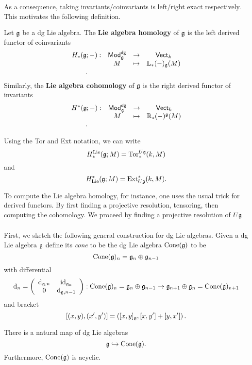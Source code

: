 \documentclass[11pt]{amsart}
\def\dgMod{{\sf Mod}^{\sf dg}}
\begin{document}
As a consequence, taking invariants/coinvariants is left/right exact respectively. 
This motivates the following definition. 

\begin{dfn}
Let $\mathfrak g$ be a dg Lie algebra.
The {\bf Lie algebra homology} of $\mathfrak g$ is the left derived functor of coinvariants
\[
\begin{array}{cccc}
H_*(\fg ; -) : & \dgMod_\fg & \to & \Vect_k \\ 
& M & \mapsto & \LL_*(-)_\fg (M) \\ .
\end{array}
\]
Similarly, the {\bf Lie algebra cohomology} of $\mathfrak g$ is the right derived functor of invariants
\[
\begin{array}{cccc}
H^*(\fg ; -) : & \dgMod_\fg & \to & \Vect_k \\ 
& M & \mapsto & \RR_*(-)^\fg (M) \\ .
\end{array}
\]
\end{dfn}

\begin{rmk}
Using the Tor and Ext notation, we can write
\[
H^{\rm Lie}_*(\mathfrak g ; M) = {\rm Tor}^{U \mathfrak g}_* (k, M)
\]
and 
\[
H_{\rm Lie}^*(\mathfrak g ; M) = {\rm Ext}^*_{U \mathfrak g}(k, M) .
\] 
\end{rmk}

To compute the Lie algebra homology, for instance, one uses the usual trick for derived functors. 
By first finding a projective resolution, tensoring, then computing the cohomology. 
We proceed by finding a projective resolution of $U\mathfrak g$ 

\subsubsection{}

First, we sketch the following general construction for dg Lie algebras.
Given a dg Lie algebra $\mathfrak g$ define its {\em cone} to be the dg Lie algebra ${\rm Cone}(\mathfrak g)$ to be
\[
{\rm Cone}(\mathfrak g)_n = \mathfrak g_n \oplus \mathfrak g_{n-1}
\]
with differential
\[
{\rm d}_n = \left(\begin{array}{cc} {\rm d}_{\mathfrak g,n} & {\rm id}_{\mathfrak g_{n}} \\ 0 & {\rm d}_{\mathfrak g, n-1} \end{array}\right) : {\rm Cone}(\mathfrak g)_{n} = \mathfrak g_n \oplus \mathfrak g_{n-1} \to \mathfrak g_{n+1} \oplus \mathfrak g_n = {\rm Cone}(\mathfrak g)_{n+1}
\]
and bracket
\[
[(x,y), (x',y')] = \left([x,y]_{\mathfrak g}, [x,y'] + [y,x']\right) .
\]

\begin{lem}
There is a natural map of dg Lie algebras
\[
\mathfrak g \hookrightarrow {\rm Cone}(\mathfrak g) .
\]
Furthermore, ${\rm Cone}(\mathfrak g)$ is acyclic.
\end{lem} 
\end{document}
